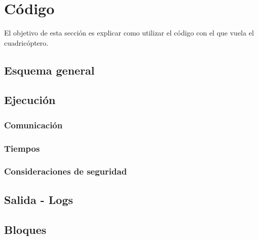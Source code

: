 \documentclass[main]{subfiles}
\begin{document}
\chapter{Código}
\label{chap:codigo}

El objetivo de esta sección es explicar como utilizar el código con el que vuela el cuadricóptero.

\section{Esquema general}
\label{sec:codigo:esquema-general}


\section{Ejecución}
\label{sec:codigo:ejecucion}


\subsection{Comunicación}
\label{sec:codigo:comunicacion}


\subsection{Tiempos}
\label{sec:codigo:tiempos}


\subsection{Consideraciones de seguridad}
\label{sec:codigo:consideraciones-de-seguridad}


\section{Salida - Logs}
\label{salidas-logs}


\section{Bloques}
\label{sec:codigo:bloques}
\end{document}
